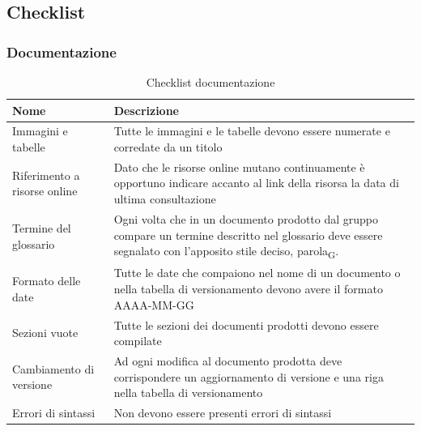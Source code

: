 \documentclass[a4paper,12pt]{article}
\begin{document}
        \subsection{Checklist}
            \subsubsection{Documentazione}

                \begin{longtable}{|M{3.5cm}|M{8.5cm}|}

                    \caption{Checklist documentazione} \\
                    \hline
                    \textbf{Nome} & \textbf{Descrizione} \\
                    \hline
                    \endhead

                    Immagini e tabelle & Tutte le immagini e le tabelle devono essere numerate e corredate da un titolo \\
                    \hline

                    Riferimento a risorse online & Dato che le risorse online mutano continuamente è opportuno indicare accanto al link della risorsa la data di ultima consultazione \\
                    \hline

                    Termine del glossario & Ogni volta che in un documento prodotto dal gruppo compare un termine descritto nel glossario deve essere segnalato con l’apposito stile deciso, parola\textsubscript{G}.\\
                    \hline

                    Formato delle date & Tutte le date che compaiono nel nome di un documento o nella tabella di versionamento devono avere il formato AAAA-MM-GG \\
                    \hline

                    Sezioni vuote & Tutte le sezioni dei documenti prodotti devono essere compilate \\
                    \hline

                    Cambiamento di versione & Ad ogni modifica al documento prodotta deve corrispondere un aggiornamento di versione e una riga nella tabella di versionamento \\
                    \hline

                    Errori di sintassi & Non devono essere presenti errori di sintassi \\
                    \hline


\end{longtable}
\end{document}

